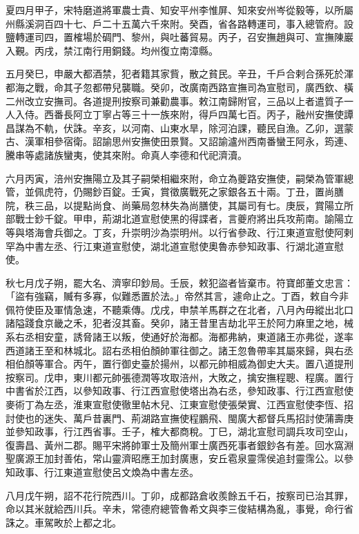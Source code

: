 \begin{pinyinscope}
 夏四月甲子，宋特磨道將軍農士貴、知安平州李惟屏、知來安州岑從毅等，以所屬州縣溪洞百四十七、戶二十五萬六千來附。癸酉，省各路轉運司，事入總管府。設鹽轉運司四，置榷場於碉門、黎州，與吐蕃貿易。丙子，召安撫趙與可、宣撫陳巖入覲。丙戌，禁江南行用銅錢。均州復立南漳縣。



 五月癸巳，申嚴大都酒禁，犯者籍其家貲，散之貧民。辛丑，千戶合剌合孫死於渾都海之戰，命其子忽都帶兒襲職。癸卯，改廣南西路宣撫司為宣慰司，廣西欽、橫二州改立安撫司。各道提刑按察司兼勸農事。敕江南歸附官，三品以上者遣質子一人入侍。西番長阿立丁寧占等三十一族來附，得戶四萬七百。丙子，融州安撫使譚昌謀為不軌，伏誅。辛亥，以河南、山東水旱，除河泊課，聽民自漁。乙卯，選蒙古、漢軍相參宿衛。詔諭思州安撫使田景賢。又詔諭瀘州西南番蠻王阿永，筠連、騰串等處諸族蠻夷，使其來附。命真人李德和代祀濟瀆。



 六月丙寅，涪州安撫陽立及其子嗣榮相繼來附，命立為夔路安撫使，嗣榮為管軍總管，並佩虎符，仍賜鈔百錠。壬寅，賞徵廣戰死之家銀各五十兩。丁丑，置尚膳院，秩三品，以提點尚食、尚藥局忽林失為尚膳使，其屬司有七。庚辰，賞陽立所部戰士鈔千錠。甲申，荊湖北道宣慰使黑的得諜者，言夔府將出兵攻荊南。諭陽立等與塔海會兵御之。丁亥，升崇明沙為崇明州。以行省參政、行江東道宣慰使阿剌罕為中書左丞、行江東道宣慰使，湖北道宣慰使奧魯赤參知政事、行湖北道宣慰使。



 秋七月戊子朔，罷大名、濟寧印鈔局。壬辰，敕犯盜者皆棄市。符寶郎董文忠言：「盜有強竊，贓有多寡，似難悉置於法。」帝然其言，遽命止之。丁酉，敕自今非佩符使臣及軍情急速，不聽乘傳。戊戌，申禁羊馬群之在北者，八月內毋縱出北口諸隘踐食京畿之禾，犯者沒其畜。癸卯，諸王昔里吉劫北平王於阿力麻里之地，械系右丞相安童，誘脅諸王以叛，使通好於海都。海都弗納，東道諸王亦弗從，遂率西道諸王至和林城北。詔右丞相伯顏帥軍往御之。諸王忽魯帶率其屬來歸，與右丞相伯顏等軍合。丙午，置行御史臺於揚州，以都元帥相威為御史大夫。置八道提刑按察司。戊申，東川都元帥張德潤等攻取涪州，大敗之，擒安撫程聰、程廣。置行中書省於江西，以參知政事、行江西宣慰使塔出為右丞，參知政事、行江西宣慰使麥術丁為左丞，淮東宣慰使徹里帖木兒、江東宣慰使張榮實、江西宣慰使李恆、招討使也的迷失、萬戶昔裏門、荊湖路宣撫使程鵬飛、閩廣大都督兵馬招討使蒲壽庚並參知政事，行江西省事。壬子，榷大都商稅。丁巳，湖北宣慰司調兵攻司空山，復壽昌、黃州二郡。賜平宋將帥軍士及簡州軍士廣西死事者銀鈔各有差。回水窩淵聖廣源王加封善佑，常山靈濟昭應王加封廣惠，安丘雹泉靈霈侯追封靈霈公。以參知政事、行江東道宣慰使呂文煥為中書左丞。



 八月戊午朔，詔不花行院西川。丁卯，成都路倉收羨餘五千石，按察司已治其罪，命以其米就給西川兵。辛未，常德府總管魯希文與李三俊結構為亂，事覺，命行省誅之。車駕畋於上都之北。




\end{pinyinscope}
